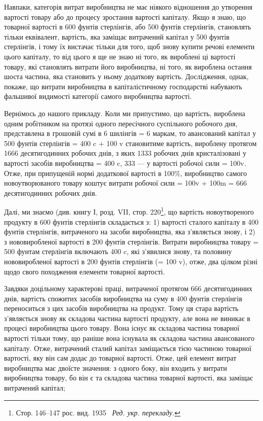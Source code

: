 
Навпаки, категорія витрат виробництва не має ніякого відношення
до утворення вартості товару або до процесу зростання
вартості капіталу. Якщо я знаю, що  товарної вартості
в 600 фунтів стерлінгів, або 500 фунтів стерлінгів, становлять
тільки еквівалент, вартість, яка заміщає витрачений капітал
у 500 фунтів стерлінгів, і тому їх вистачає тільки для того, щоб
знову купити речові елементи цього капіталу, то від цього
я ще не знаю ні того, як вироблені ці   вартості товару, які
становлять витрати його виробництва, ні того, як вироблена
остання шоста частина, яка становить у ньому додаткову вартість.
Дослідження, однак, покаже, що витрати виробництва в капіталістичному
господарстві набувають фальшивої видимості категорії
самого виробництва вартості.

Вернімось до нашого прикладу. Коли ми припустимо, що вартість,
вироблена одним робітником на протязі одного пересічного
суспільного робочого дня, представлена в грошовій сумі
в 6 шилінгів = 6 маркам, то авансований капітал у 500 фунтів
стерлінгів = 400 c + 100 v становитиме вартість, вироблену протягом
1666 десятигодинних робочих днів, з яких 1333 робочих
днів кристалізовані у вартості засобів виробництва = 400 c,
333  — у вартості робочої сили = 100v. Отже, при припущеній
нормі додаткової вартості в 100\%, виробництво самого новоутворюваного
товару коштує витрати робочої сили = 100v +
100m = 666  десятигодинних робочих днів.

Далі, ми знаємо (див. книгу І, розд. VII, стор. 220\footnote*{Стор. 146--147 рос. вид. 1935~ \emph{Ред. укр. перекладу.}}, що вартість
новоутвореного продукту в 600 фунтів стерлінгів складається
з: 1) вартості сталого капіталу в 400 фунтів стерлінгів,
витраченого на засоби виробництва, яка з’являється знову, і
2) з нововиробленої вартості в 200 фунтів стерлінгів. Витрати
виробництва товару = 500 фунтам стерлінгів включають 400 c,
які з’явилися знову, та половину нововиробленої вартості в
200 фунтів стерлінгів (= 100 v), отже, два цілком різні щодо
свого походження елементи товарної вартості.

Завдяки доцільному характерові праці, витраченої протягом
666  десятигодинних днів, вартість спожитих засобів виробництва
на суму в 400 фунтів стерлінгів переноситься з цих
засобів виробництва на продукт. Тому ця стара вартість з’являється
знову як складова частина вартості продукту, але вона
не виникає в процесі виробництва цього товару. Вона існує як
складова частина товарної вартості тільки тому, що раніше вона
існувала як складова частина авансованого капіталу. Отже, витрачений
сталий капітал заміщається тією частиною товарної
вартості, яку він сам додає до товарної вартості. Отже, цей
елемент витрат виробництва має двоїсте значення: з одного боку,
він входить у витрати виробництва товару, бо він є та складова
частина товарної вартості, яка заміщає витрачений капітал;
\parbreak{}  %

